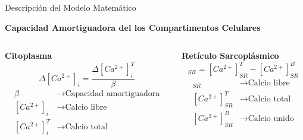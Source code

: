 \begin{frame}{Descripción del Modelo Matemático}
	\begin{center}
		{\Large \textbf{Capacidad Amortiguadora del los Compartimentos Celulares}}
	\end{center}
	
	\large \begin{columns}
		\begin{column}{0.45\textwidth}
			\textbf{Citoplasma}
			\begin{equation*}
			\Delta [Ca^{2+}]_i = \frac{\Delta [Ca^{2+}]_i^T}{\beta}
			\end{equation*}
			\begin{align*}
			\beta & \rightarrow \text{Capacidad amortiguadora} \\
			[Ca^{2+}]_i & \rightarrow \text{Calcio libre} \\
			[Ca^{2+}]_i^T & \rightarrow \text{Calcio total}
			\end{align*}
		\end{column}
		\begin{column}{0.55\textwidth}
			\textbf{Retículo Sarcoplásmico}
			\begin{equation*}
			[Ca^{2+}]_{SR} = [Ca^{2+}]_{SR}^T - [Ca^{2+}]_{SR}^B 
			\end{equation*}
			\begin{align*}
			[Ca^{2+}]_{SR} & \rightarrow \text{Calcio libre} \\
			[Ca^{2+}]_{SR}^T & \rightarrow \text{Calcio total} \\
			[Ca^{2+}]_{SR}^B & \rightarrow \text{Calcio unido}
			\end{align*}
		\end{column}
	\end{columns}	
\end{frame}